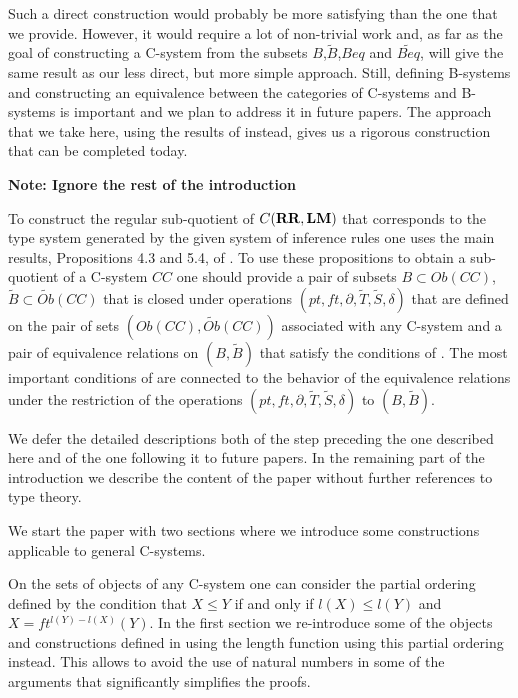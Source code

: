 \documentclass[12pt]{amsart}
\newcommand{\wt}{\widetilde}
\newcommand{\RR}{{\bf RR}}
\newcommand{\LM}{{\bf LM}}
\begin{document}
Such a direct construction would probably be more satisfying than the one that we provide. However, it would require a lot of non-trivial work and, as far as the goal of constructing a C-system from the subsets $B$,$\wt{B}$,$Beq$ and $\wt{Beq}$, will give the same result as our less direct, but more simple approach. Still, defining B-systems and constructing an equivalence between the categories of C-systems and B-systems is important and we plan to address it in future papers. The approach that we take here, using the results of \cite{Csubsystems} instead, gives us a rigorous construction that can be completed today. 


{\bf Note: Ignore the rest of the introduction}






To construct the regular sub-quotient of  $C(\RR,\LM)$ that corresponds to the type system generated by the given system of inference rules one uses the main results, Propositions 4.3 and 5.4, of \cite{Csubsystems}. To use these propositions to obtain a sub-quotient of a C-system $CC$ one should provide a pair of subsets $B\subset Ob(CC)$, $\wt{B}\subset \wt{Ob}(CC)$ that is closed under operations $(pt,ft,\partial,\wt{T},\wt{S},\delta)$ that are defined on the pair of sets $(Ob(CC),\wt{Ob}(CC))$ associated with any C-system \cite[Prop. 4.3]{Csubsystems} and a pair of equivalence relations on $(B,\wt{B})$ that satisfy the conditions of \cite[Prop. 5.4]{Csubsystems}. The most important conditions of \cite[Prop. 5.4]{Csubsystems} are connected to the behavior of the equivalence relations under the restriction of the operations $(pt,ft,\partial,\wt{T},\wt{S},\delta)$ to $(B,\wt{B})$. 







We defer the detailed descriptions both of the step preceding the one described here and of the one following it to future papers. In the remaining part of the introduction we describe the content of the paper without further references to type theory. 

We start the paper with two sections where we introduce some constructions applicable to general C-systems. 

On the sets of objects of any C-system one can consider the partial ordering defined by the condition that $X\le Y$ if and only if $l(X)\le l(Y)$ and $X=ft^{l(Y)-l(X)}(Y)$. In the first section we re-introduce some of the objects and constructions defined in \cite{Csubsystems} using the length function using this partial ordering instead. This allows to avoid the use of natural numbers in some of the arguments that significantly simplifies the proofs. 
\end{document}

